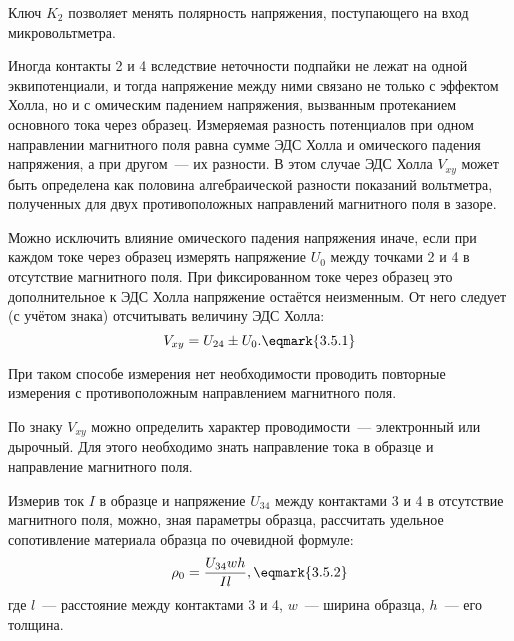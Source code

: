Ключ $K_2$ позволяет менять полярность напряжения, поступающего на вход микровольтметра.

Иногда контакты 2 и 4 вследствие неточности подпайки не лежат на одной эквипотенциали, и тогда напряжение между ними связано не только с эффектом Холла, но и с омическим падением напряжения, вызванным протеканием основного тока через образец. Измеряемая разность потенциалов при одном направлении магнитного поля равна сумме ЭДС Холла и омического падения напряжения, а при другом~--- их разности. В этом случае ЭДС Холла $V_{xy}$ может быть определена как половина алгебраической разности показаний вольтметра, полученных для двух противоположных направлений магнитного поля в зазоре.

Можно исключить влияние омического падения напряжения иначе, если при каждом токе через образец измерять
напряжение $U_0$ между точками 2 и 4 в отсутствие магнитного поля. При фиксированном токе через образец это
дополнительное к ЭДС Холла напряжение остаётся неизменным. От него следует (с учётом знака) отсчитывать величину
ЭДС Холла:
\begin{equation}
	V_{xy}=U_{24}\pm U_0.
	\eqmark{3.5.1}
\end{equation}

При таком способе измерения нет необходимости проводить повторные измерения с противоположным направлением магнитного поля.

По знаку $V_{xy}$ можно определить характер проводимости~--- электронный или дырочный. Для этого необходимо знать направление тока в образце и направление магнитного поля.

Измерив ток $I$ в образце и напряжение $U_{34}$ между контактами 3 и 4 в отсутствие магнитного поля, можно, зная
параметры образца, рассчитать удельное сопотивление материала образца по очевидной формуле:
\begin{equation}
	\rho_0=\frac{U_{34}wh}{Il},
	\eqmark{3.5.2}
\end{equation}
где $l$~--- расстояние между контактами 3 и 4, $w$~--- ширина образца, $h$~--- его толщина.

